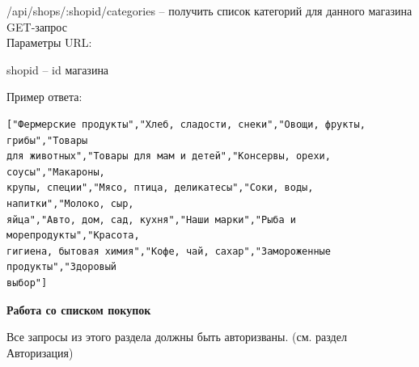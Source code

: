 \noindent
/api/shops/:shopid/categories -- получить список категорий для данного магазина\\
GET-запрос\\
Параметры URL:
\begin{my_enumerate}
  \item shopid -- id магазина
\end{my_enumerate}
Пример ответа:
\begin{verbatim}
["Фермерские продукты","Хлеб, сладости, снеки","Овощи, фрукты, грибы","Товары
для животных","Товары для мам и детей","Консервы, орехи, соусы","Макароны,
крупы, специи","Мясо, птица, деликатесы","Соки, воды, напитки","Молоко, сыр,
яйца","Авто, дом, сад, кухня","Наши марки","Рыба и морепродукты","Красота,
гигиена, бытовая химия","Кофе, чай, сахар","Замороженные продукты","Здоровый
выбор"]
\end{verbatim}

\textbf{Работа со списком покупок}

\noindent
Все запросы из этого раздела должны быть авторизваны. (см. раздел Авторизация)

